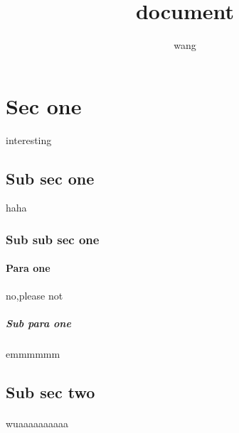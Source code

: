 \documentclass{article}
\title{document}
\author{wang}
\begin{document}
\maketitle
\section{Sec one} interesting
\subsection{Sub sec one} haha
\subsubsection{Sub sub sec one}
\paragraph{Para one}no,please not
\subparagraph{Sub para one} emmmmmm
\subsection{Sub sec two}
\paragraph{} wuaaaaaaaaaa
\end{document}

